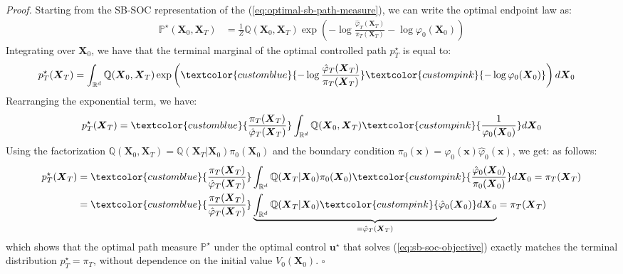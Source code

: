\documentclass{article}
\newcommand{\bluetext}[1]{\textcolor{customblue}{#1}}
\newcommand{\pinktext}[1]{\textcolor{custompink}{#1}}
\begin{document}
\textit{Proof.} 
Starting from the SB-SOC representation of the (\ref{eq:optimal-sb-path-measure}), we can write the optimal endpoint law as:
\begin{align}
    \mathbb{P}^\star(\boldsymbol{X}_0, \boldsymbol{X}_T)&=\frac{1}{Z}\mathbb{Q}(\boldsymbol{X}_0, \boldsymbol{X}_T)\exp\left(-\log \frac{\hat{\varphi}_T(\boldsymbol{X}_T)}{\pi_T(\boldsymbol{X}_T)}-\log \varphi_0(\boldsymbol{X}_0)\right)
\end{align}
Integrating over $\boldsymbol{X}_0$, we have that the terminal marginal of the optimal controlled path $p^\star_T$ is equal to:
\begin{align}
    p_T^\star(\boldsymbol{X}_T)&=\int_{\mathbb{R}^d}\mathbb{Q}(\boldsymbol{X}_0, \boldsymbol{X}_T)\exp\left(\bluetext{-\log \frac{\hat{\varphi}_T(\boldsymbol{X}_T)}{\pi_T(\boldsymbol{X}_T)}} \pinktext{-\log \varphi_0(\boldsymbol{X}_0)}\right)d\boldsymbol{X}_0
\end{align}
Rearranging the exponential term, we have:
\begin{align}
p_T^\star(\boldsymbol{X}_T)=\bluetext{\frac{\pi_T(\boldsymbol{X}_T)}{\hat{\varphi}_T(\boldsymbol{X}_T)}}\int_{\mathbb{R}^d}\mathbb{Q}(\boldsymbol{X}_0, \boldsymbol{X}_T)\pinktext{\frac{1}{\varphi_0(\boldsymbol{X}_0)}}d\boldsymbol{X}_0
\end{align}
Using the factorization $\mathbb{Q}(\boldsymbol{X}_0,\boldsymbol{X}_T)=\mathbb{Q}(\boldsymbol{X}_T|\boldsymbol{X}_0)\pi_0(\boldsymbol{X}_0)$ and the boundary condition $\pi_0(\boldsymbol{x})=\varphi_0(\boldsymbol{x})\hat{\varphi}_0(\boldsymbol{x})$, we get:
as follows:
\begin{align}
    p_T^\star(\boldsymbol{X}_T)&=\bluetext{\frac{\pi_T(\boldsymbol{X}_T)}{\hat{\varphi}_T(\boldsymbol{X}_T)}}\int_{\mathbb{R}^d}\mathbb{Q}(\boldsymbol{X}_T|\boldsymbol{X}_0)\pi_0(\boldsymbol{X}_0)\pinktext{\frac{\hat{\varphi}_0(\boldsymbol{X}_0)}{\pi_0(\boldsymbol{X}_0)}}d\boldsymbol{X}_0=\pi_T(\boldsymbol{X}_T)\nonumber\\
    &=\bluetext{\frac{\pi_T(\boldsymbol{X}_T)}{\hat{\varphi}_T(\boldsymbol{X}_T)}}\underbrace{\int_{\mathbb{R}^d}\mathbb{Q}(\boldsymbol{X}_T|\boldsymbol{X}_0)\pinktext{\hat{\varphi}_0(\boldsymbol{X}_0)}d\boldsymbol{X}_0}_{=\hat{\varphi}_T(\boldsymbol{X}_T)}=\pi_T(\boldsymbol{X}_T)
\end{align}
which shows that the optimal path measure $\mathbb{P}^\star$ under the optimal control $\boldsymbol{u}^\star$ that solves (\ref{eq:sb-soc-objective}) exactly matches the terminal distribution $p^\star_T=\pi_T$, without dependence on the initial value $V_0(\boldsymbol{X}_0)$. \hfill $\square$
\end{document}
